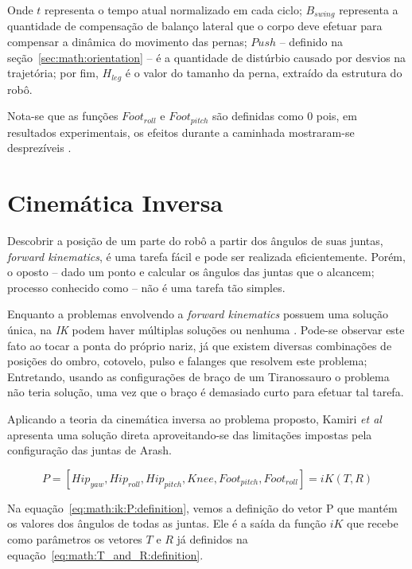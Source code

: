Onde $t$ representa o tempo atual normalizado em cada ciclo; $B_{swing}$ representa a quantidade de compensação de balanço lateral que o corpo deve efetuar para compensar a dinâmica do movimento das pernas; $Push$ -- definido na seção~\ref{sec:math:orientation} -- é a quantidade de distúrbio causado por desvios na trajetória; por fim, $H_{leg}$ é o valor do tamanho da perna, extraído da estrutura do robô.

Nota-se que as funções $Foot_{roll}$ e $Foot_{pitch}$ são definidas como $0$ pois, em resultados experimentais, os efeitos durante a caminhada mostraram-se desprezíveis \cite{karimionline}.

\section{Cinemática Inversa}

Descobrir a posição de um parte do robô a partir dos ângulos de suas juntas, \textit{forward kinematics}, é uma tarefa fácil e pode ser realizada eficientemente. Porém, o oposto -- dado um ponto e calcular os ângulos das juntas que o alcancem; processo conhecido como -- não é uma tarefa tão simples.

Enquanto a problemas envolvendo a \textit{forward kinematics} possuem uma solução única, na \textit{IK} podem haver múltiplas soluções ou nenhuma \cite{spong2005robot}. Pode-se observar este fato ao tocar a ponta do próprio nariz, já que existem diversas combinações de posições do ombro, cotovelo, pulso e falanges que resolvem este problema; Entretando, usando as configurações de braço de um Tiranossauro o problema não teria solução, uma vez que o braço é demasiado curto para efetuar tal tarefa.

Aplicando a teoria da cinemática inversa ao problema proposto, Kamiri \textit{et al} apresenta uma solução direta aproveitando-se das limitações impostas pela configuração das juntas de Arash.

\begin{equation}
	\label{eq:math:ik:P:definition}
	P = [Hip_{yaw}, Hip_{roll}, Hip_{pitch}, Knee, Foot_{pitch}, Foot_{roll}] = iK(T, R)
\end{equation}

Na equação~\ref{eq:math:ik:P:definition}, vemos a definição do vetor P que mantém os valores dos ângulos de todas as juntas. Ele é a saída da função $iK$ que recebe como parâmetros os vetores $T$ e $R$ já definidos na equação~\ref{eq:math:T_and_R:definition}.

